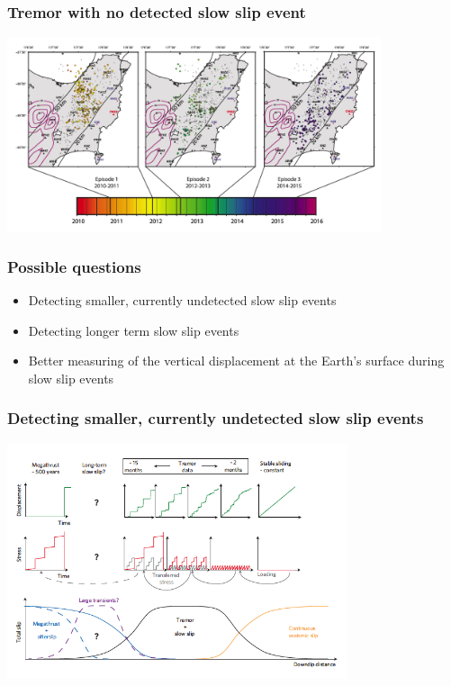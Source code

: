 \documentclass{beamer}
\begin{document}
	\begin{frame}
		\frametitle{Tremor with no detected slow slip event}
		\begin{center}
			\includegraphics[trim={0cm 0cm 0cm 0cm}, clip, width=11cm]{articles/todd_schwartz_2016_6.png}
		\end{center}
	\end{frame}

	\begin{frame}
		\frametitle{Possible questions}
		\begin{itemize}
			\item Detecting smaller, currently undetected slow slip events
			\item Detecting longer term slow slip events
			\item Better measuring of the vertical displacement at the Earth’s surface during slow slip events
		\end{itemize}
	\end{frame}

	\begin{frame}
		\frametitle{Detecting smaller, currently undetected slow slip events}
		\begin{center}
			\includegraphics[trim={0cm 0cm 0cm 0cm}, clip, width=10cm]{articles/wech_creager_2011_3.png}
		\end{center}
	\end{frame}
\end{document}
